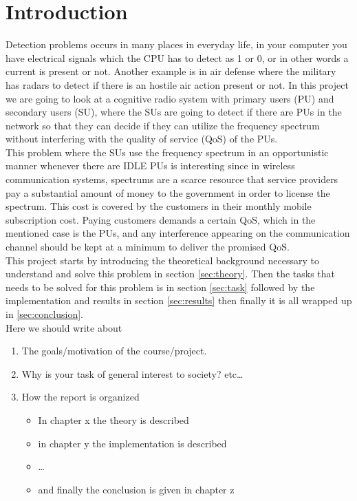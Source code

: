 \section{Introduction}\label{sec:intro}
Detection problems occurs in many places in everyday life, in your computer you have electrical signals which the CPU has to detect as 1 or 0, or in other words a current is present or not. Another example is in air defense where the military has radars to detect if there is an hostile air action present or not. In this project we are going to look at a cognitive radio system with primary users (PU) and secondary users (SU), where the SUs are going to detect if there are PUs in the network so that they can decide if they can utilize the frequency spectrum without interfering with the quality of service (QoS) of the PUs.\\
This problem where the SUs use the frequency spectrum in an opportunistic manner whenever there are IDLE PUs is interesting since in wireless communication systems, spectrums are a scarce resource that service providers pay a substantial amount of money to the government in order to license the spectrum. This cost is covered by the customers in their monthly mobile subscription cost. Paying customers demands a certain QoS, which in the mentioned case is the PUs, and any interference appearing on the communication channel should be kept at a minimum to deliver the promised QoS.\\
This project starts by introducing the theoretical background necessary to understand and solve this problem in section \ref{sec:theory}. Then the tasks that needs to be solved for this problem is in section \ref{sec:task} followed by the implementation and results in section \ref{sec:results} then finally it is all wrapped up in \ref{sec:conclusion}.\\

Here we should write about
\begin{enumerate}[i]
	\item The goals/motivation of the course/project.
	\item Why is your task of general interest to society? etc\dots
	\item How the report is organized
	\begin{itemize}
		\item In chapter x the theory is described
		\item in chapter y the implementation is described
		\item \dots
		\item and finally the conclusion is given in chapter z
	\end{itemize}
\end{enumerate}
